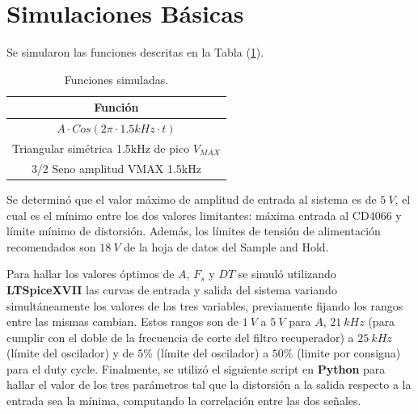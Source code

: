 


\section{Simulaciones Básicas}

Se simularon las funciones descritas en la Tabla (\ref{fn}).
\begin{table}[H]
\centering
\begin{tabular}{@{}c@{}}
\toprule
Función \\ \midrule
$A\cdot Cos(2\pi \cdot 1.5kHz \cdot t)$ \\
Triangular simétrica 1.5kHz de pico $V_{MAX}$ \\
3/2 Seno amplitud VMAX 1.5kHz \\ \bottomrule
\end{tabular}
\caption{Funciones simuladas.}
\label{fn}
\end{table}

Se determinó que el valor máximo de amplitud de entrada al sistema es de $5 \ V$, el cual es el mínimo entre los dos valores limitantes: máxima entrada al CD4066 y límite mínimo de distorsión. Además, los límites de tensión de alimentación recomendados son $18 \ V$ de la hoja de datos del Sample and Hold.

Para hallar los valores óptimos de $A$, $F_s$ y $DT$ se simuló utilizando \textbf{LTSpiceXVII} las curvas de entrada y salida del sistema variando simultáneamente los valores de las tres variables, previamente fijando los rangos entre las mismas cambian. Estos rangos son de $1 \ V$ a $5 \ V$ para $A$, $21 \ kHz$ (para cumplir con el doble de la frecuencia de corte del filtro recuperador) a $25 \ kHz$ (límite del oscilador) y de $5\%$ (límite del oscilador) a $50\%$ (limite por consigna) para el duty cycle. Finalmente, se utilizó el siguiente script en \textbf{Python} para hallar el valor de los tres parámetros tal que la distorsión a la salida respecto a la entrada sea la mínima, computando la correlación entre las dos señales.
\begin{figure}[H]
\centering
\scalebox{0.75}{}
\end{figure}


